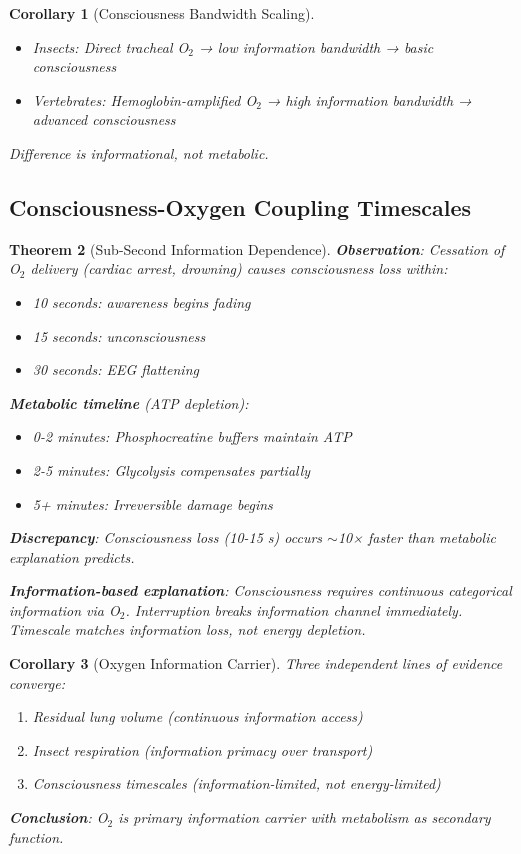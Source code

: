 \documentclass[11pt,a4paper]{article}
\newtheorem{theorem}{Theorem}[section]
\newtheorem{corollary}[theorem]{Corollary}
\theoremstyle{definition}
\theoremstyle{remark}
\begin{document}
\begin{corollary}[Consciousness Bandwidth Scaling]
\begin{itemize}
\item Insects: Direct tracheal O$_2$ → low information bandwidth → basic consciousness
\item Vertebrates: Hemoglobin-amplified O$_2$ → high information bandwidth → advanced consciousness
\end{itemize}

Difference is \textit{informational}, not metabolic.
\end{corollary}

\subsection{Consciousness-Oxygen Coupling Timescales}

\begin{theorem}[Sub-Second Information Dependence]
\textbf{Observation}: Cessation of O$_2$ delivery (cardiac arrest, drowning) causes consciousness loss within:
\begin{itemize}
\item 10 seconds: awareness begins fading
\item 15 seconds: unconsciousness
\item 30 seconds: EEG flattening
\end{itemize}

\textbf{Metabolic timeline} (ATP depletion):
\begin{itemize}
\item 0-2 minutes: Phosphocreatine buffers maintain ATP
\item 2-5 minutes: Glycolysis compensates partially
\item 5+ minutes: Irreversible damage begins
\end{itemize}

\textbf{Discrepancy}: Consciousness loss (10-15 s) occurs $\sim$10× faster than metabolic explanation predicts.

\textbf{Information-based explanation}: Consciousness requires continuous categorical information via O$_2$. Interruption breaks information channel immediately. Timescale matches \textit{information loss}, not energy depletion.
\end{theorem}

\begin{corollary}[Oxygen Information Carrier]
\label{cor:oxygen_carrier}
Three independent lines of evidence converge:
\begin{enumerate}
\item Residual lung volume (continuous information access)
\item Insect respiration (information primacy over transport)
\item Consciousness timescales (information-limited, not energy-limited)
\end{enumerate}

\textbf{Conclusion}: O$_2$ is \textit{primary information carrier} with metabolism as \textit{secondary function}.
\end{corollary}
\end{document}
